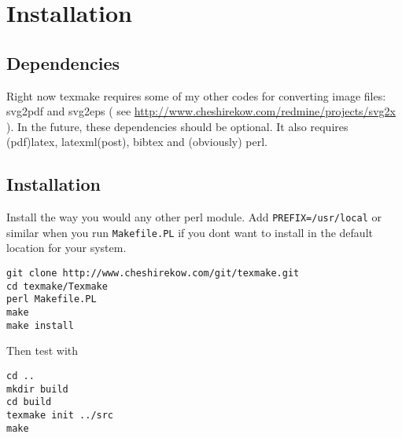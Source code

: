 \chapter{Installation}

\section{Dependencies}
Right now texmake requires some of my other codes for converting image files: svg2pdf and svg2eps ( see \url{http://www.cheshirekow.com/redmine/projects/svg2x} ).
%
In the future, these dependencies should be optional.
%
It also requires (pdf)latex, latexml(post), bibtex and (obviously) perl.

\section{Installation}

Install the way you would any other perl module. Add \verb|PREFIX=/usr/local| or similar when you run \verb|Makefile.PL| if you dont want to install in the default location for your system.

\begin{lstlisting}
git clone http://www.cheshirekow.com/git/texmake.git
cd texmake/Texmake
perl Makefile.PL
make
make install
\end{lstlisting}

Then test with 

\begin{lstlisting}
cd ..
mkdir build
cd build
texmake init ../src
make
\end{lstlisting}


